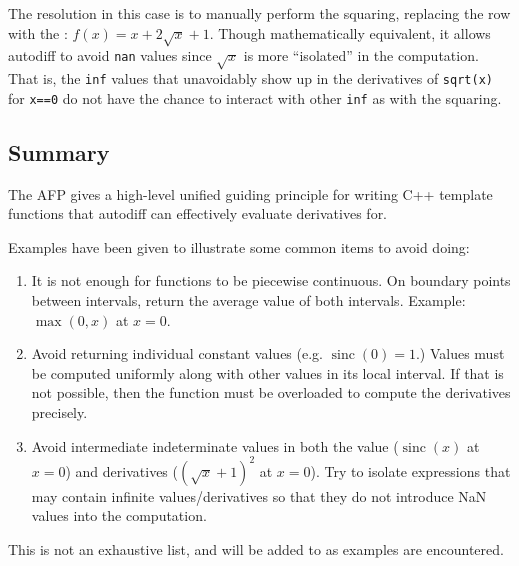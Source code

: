 \documentclass{article}
\DeclareMathOperator{\sinc}{sinc}
\begin{document}
The resolution in this case is to manually perform the squaring, replacing the  row with the :
$f(x)=x+2\sqrt{x}+1$. Though mathematically equivalent, it allows autodiff to avoid {\tt nan} values since
$\sqrt x$ is more ``isolated'' in the computation. That is, the {\tt inf} values that unavoidably show up
in the derivatives of {\tt sqrt(x)} for {\tt x==0} do not have the chance to interact with other {\tt inf} as
with the squaring.

\subsection{Summary}

The AFP gives a high-level unified guiding principle for writing C++ template functions that autodiff can
effectively evaluate derivatives for.

Examples have been given to illustrate some common items to avoid doing:

\begin{enumerate}
\item It is not enough for functions to be piecewise continuous. On boundary points between intervals, return the
    average value of both intervals. Example: $\max(0,x)$ at $x=0$.
\item Avoid returning individual constant values (e.g. $\sinc(0)=1$.) Values must be computed uniformly along
    with other values in its local interval. If that is not possible, then the function must be overloaded to
    compute the derivatives precisely.
\item Avoid intermediate indeterminate values in both the value ($\sinc(x)$ at $x=0$) and derivatives
    ($(\sqrt{x}+1)^2$ at $x=0$). Try to isolate expressions that may contain infinite values/derivatives so
    that they do not introduce NaN values into the computation.
\end{enumerate}
This is not an exhaustive list, and will be added to as examples are encountered.
\end{document}
